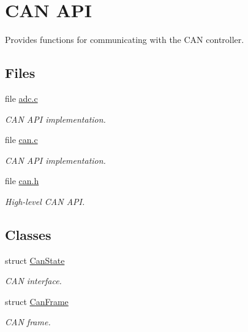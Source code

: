 \hypertarget{group___c_a_n}{\section{C\-A\-N A\-P\-I}
\label{group___c_a_n}
}


Provides functions for communicating with the C\-A\-N controller.  


\subsection*{Files}
\begin{DoxyCompactItemize}
\item 
file \hyperlink{adc_8c}{adc.\-c}
\begin{DoxyCompactList}\small\item\em C\-A\-N A\-P\-I implementation. \end{DoxyCompactList}\item 
file \hyperlink{can_8c}{can.\-c}
\begin{DoxyCompactList}\small\item\em C\-A\-N A\-P\-I implementation. \end{DoxyCompactList}\item 
file \hyperlink{can_8h}{can.\-h}
\begin{DoxyCompactList}\small\item\em High-\/level C\-A\-N A\-P\-I. \end{DoxyCompactList}\end{DoxyCompactItemize}
\subsection*{Classes}
\begin{DoxyCompactItemize}
\item 
struct \hyperlink{struct_can_state}{Can\-State}
\begin{DoxyCompactList}\small\item\em C\-A\-N interface. \end{DoxyCompactList}\item 
struct \hyperlink{struct_can_frame}{Can\-Frame}
\begin{DoxyCompactList}\small\item\em C\-A\-N frame. \end{DoxyCompactList}\end{DoxyCompactItemize}
